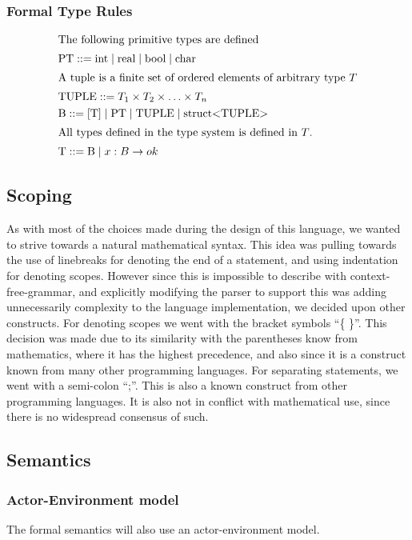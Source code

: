 \subsubsection{Formal Type Rules}

\begin{align*}
\intertext{The following primitive types are defined}
&\text{PT} ::= \text{int} \mid \text{real} \mid \text{bool} \mid \text{char}
\\
\intertext{A tuple is a finite set of ordered elements of arbitrary type $T$}
&\text{TUPLE} ::= T_1 \times T_2 \times \ldots \times T_n
\\            
&\text{B} ::=  \left[ \text{T} \right] \mid \text{PT} \mid \text{TUPLE} \mid \text{struct<TUPLE>}
\\            
\intertext{All types defined in the type system is defined in $T$.}
&\text{T} ::= \text{B} \mid x : B \rightarrow ok
\end{align*}

\subsection{Scoping}

As with most of the choices made during the design of this language, we wanted to strive towards a natural mathematical syntax. This idea was pulling towards the use of linebreaks for denoting the end of a statement, and using indentation for denoting scopes. However since this is impossible to describe with context-free-grammar, and explicitly modifying the parser to support this was adding unnecessarily complexity to the language implementation, we decided upon other constructs.
For denoting scopes we went with the bracket symbols \enquote{\{ \}}. This decision was made due to its similarity with the parentheses know from mathematics, where it has the highest precedence, and also since it is a construct known from many other programming languages. For separating statements, we went with a semi-colon \enquote{;}. This is also a known construct from other programming languages. It is also not in conflict with mathematical use, since there is no widespread consensus of such.


\subsection{Semantics}


\subsubsection{Actor-Environment model}
The formal semantics will also use an actor-environment model.

